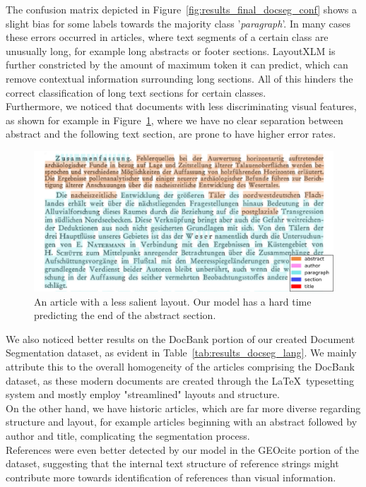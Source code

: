 The confusion matrix depicted in Figure~\ref{fig:results_final_docseg_conf} shows a slight bias for some labels towards the majority class '\textit{paragraph}'. In many cases these errors occurred in articles, where text segments of a certain class are unusually long, for example long abstracts or footer sections. LayoutXLM is further constricted by the amount of maximum token it can predict, which can remove contextual information surrounding long sections. All of this hinders the correct classification of long text sections for certain classes.\\
Furthermore, we noticed that documents with less discriminating visual features, as shown for example in Figure~\ref{fig:no_seperation}, where we have no clear separation between abstract and the following text section, are prone to have higher error rates.\\
\begin{figure}[!t]
    \centering
    \includegraphics[width=0.8\linewidth]{images/no_seperation.png}
    \caption{An article with a less salient layout. Our model has a hard time predicting the end of the abstract section.}
    \label{fig:no_seperation}
\end{figure}
We also noticed better results on the DocBank portion of our created Document Segmentation dataset, as evident in Table~\ref{tab:results_docseg_lang}. We mainly attribute this to the overall homogeneity of the articles comprising the DocBank dataset, as these modern documents are created through the \LaTeX~typesetting system and mostly employ "streamlined" layouts and structure.\\
On the other hand, we have historic articles, which are far more diverse regarding structure and layout, for example articles beginning with an abstract followed by author and title, complicating the segmentation process.\\
References were even better detected by our model in the GEOcite portion of the dataset, suggesting that the internal text structure of reference strings might contribute more towards identification of references than visual information.\par

